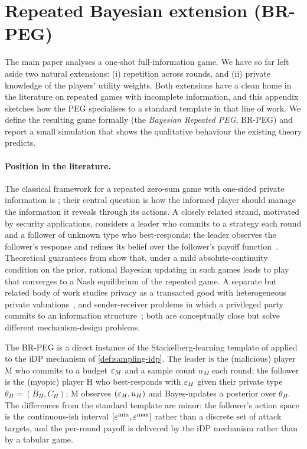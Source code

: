\section{Repeated Bayesian extension (BR-PEG)}
\label{app:bayesian}

The main paper analyses a one-shot full-information game. We have so far
left aside two natural extensions: (i) repetition across rounds, and (ii)
private knowledge of the players' utility weights. Both extensions have a
clean home in the literature on repeated games with incomplete
information, and this appendix sketches how the PEG specialises to a
standard template in that line of work. We define the resulting game
formally (the \emph{Bayesian Repeated PEG}, BR-PEG) and report a small
simulation that shows the qualitative behaviour the existing theory
predicts.

\paragraph{Position in the literature.}
The classical framework for a repeated zero-sum game with one-sided
private information is \citet{aumann1995repeated}; their central question
is how the informed player should manage the information it reveals
through its actions. A closely related strand, motivated by security
applications, considers a leader who commits to a strategy each round and
a follower of unknown type who best-responds; the leader observes the
follower's response and refines its belief over the follower's payoff
function~\cite{letchford2009learning, blum2014learning,
balcan2015commitment}. Theoretical guarantees from
\citet{kalai1993rational} show that, under a mild absolute-continuity
condition on the prior, rational Bayesian updating in such games leads to
play that converges to a Nash equilibrium of the repeated game. A
separate but related body of work studies privacy as a transacted good
with heterogeneous private valuations~\cite{ghosh2011selling}, and
sender-receiver problems in which a privileged party commits to an
information structure~\cite{kamenica2011bayesian}; both are conceptually
close but solve different mechanism-design problems.

The BR-PEG is a direct instance of the Stackelberg-learning template of
\citet{letchford2009learning, blum2014learning, balcan2015commitment}
applied to the iDP mechanism of \cref{def:sampling-idp}. The leader is
the (malicious) player M who commits to a budget $\varepsilon_M$ and a sample
count $n_M$ each round; the follower is the (myopic) player H who
best-responds with $\varepsilon_H$ given their private type $\theta_H = (B_H,
C_H)$; M observes $(\varepsilon_H, u_H)$ and Bayes-updates a posterior over
$\theta_H$. The differences from the standard template are minor: the
follower's action space is the continuous-ish interval
$[\varepsilon^{\min}, \varepsilon^{\max}]$ rather than a discrete set of attack
targets, and the per-round payoff is delivered by the iDP mechanism
rather than by a tabular game.

